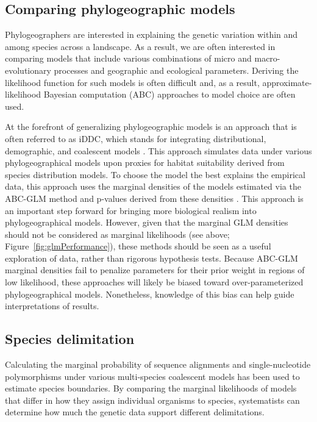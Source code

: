 \subsection{Comparing phylogeographic models}

Phylogeographers are interested in explaining the genetic variation within and
among species across a landscape.
As a result, we are often interested in comparing models that include
various combinations of micro and macro-evolutionary processes and geographic
and ecological parameters.
Deriving the likelihood function for such models is often difficult and, as a
result, approximate-likelihood Bayesian computation (ABC) approaches to model
choice are often used.

At the forefront of generalizing phylogeographic models is an approach that is
often referred to as iDDC, which stands for integrating distributional,
demographic, and coalescent models \citep{Papadopoulou2016}.
This approach simulates data under various phylogeographical models upon
proxies for habitat suitability derived from species distribution models.
To choose the model the best explains the empirical data, this approach
uses the marginal densities of the models estimated via the ABC-GLM method
and p-values derived from these densities
\citep{He2013}
\citep{Massatti2016}
\citep{Bemmels2016}
\citep{Knowles2017}
\citep{Papadopoulou2016}.
This approach is an important step forward for bringing more biological realism
into phylogeographical models.
However, given that the marginal GLM densities should not be considered as
marginal likelihoods (see above; Figure~\ref{fig:glmPerformance}), these
methods should be seen as a useful exploration of data, rather than rigorous
hypothesis tests.
Because ABC-GLM marginal densities fail to penalize parameters for their
prior weight in regions of low likelihood, these approaches will likely
be biased toward over-parameterized phylogeographical models.
Nonetheless, knowledge of this bias can help guide interpretations of results.


\subsection{Species delimitation}
Calculating the marginal probability of sequence alignments \citep{Grummer2013}
and single-nucleotide polymorphisms \citep{Leache2014}
under various multi-species coalescent models has been used
to estimate species boundaries.
By comparing the marginal likelihoods of models that differ in how they assign
individual organisms to species, systematists can determine how much the
genetic data support different delimitations.


